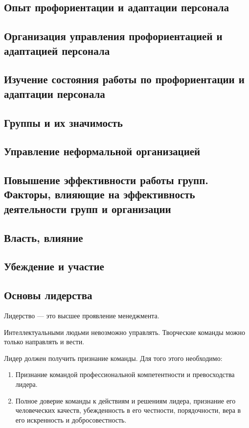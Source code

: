 \documentclass[a4paper,12pt,oneside,final]{extarticle}
\numberwithin{equation}{section}
\begin{document}
\subsection{Опыт профориентации и адаптации персонала}

\subsection{Организация управления профориентацией и адаптацией персонала}

\subsection{Изучение состояния работы по профориентации и адаптации персонала}

\subsection{Группы и их значимость}

\subsection{Управление неформальной организацией }

\subsection{Повышение эффективности работы групп. Факторы, влияющие на эффективность деятельности групп и организации}

\subsection{Власть, влияние}

\subsection{Убеждение и участие}

\subsection{Основы лидерства}
Лидерство --- это высшее проявление менеджмента.

Интеллектуальными людьми невозможно управлять. 
Творческие команды можно только направлять и вести.

Лидер должен получить признание команды. 
Для того этого необходимо:
\begin{enumerate}
	\item Признание командой профессиональной компетентности и превосходства лидера.
	\item Полное доверие команды к действиям и решениям лидера, признание его человеческих качеств, убежденность в его честности, порядочности, вера в его искренность и добросовестность.
\end{enumerate}
\end{document}
